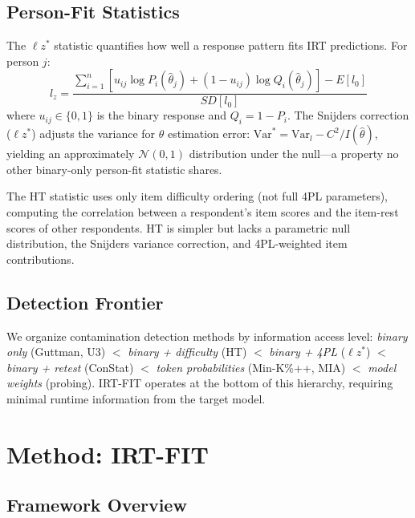 \documentclass[11pt,twocolumn]{article}
\newcommand{\lzs}{\ensuremath{\ell z^*}}
\begin{document}
\subsection{Person-Fit Statistics}

The $\lzs$ statistic \citep{drasgow1985appropriateness,snijders2001} quantifies how well a response pattern fits IRT predictions. For person $j$:
\begin{equation}
l_z = \frac{\sum_{i=1}^{n} [u_{ij} \log P_i(\hat{\theta}_j) + (1-u_{ij}) \log Q_i(\hat{\theta}_j)] - E[l_0]}{SD[l_0]}
\end{equation}
where $u_{ij} \in \{0,1\}$ is the binary response and $Q_i = 1 - P_i$. The Snijders correction ($\lzs$) adjusts the variance for $\theta$ estimation error: $\text{Var}^* = \text{Var}_{l} - C^2 / I(\hat{\theta})$, yielding an approximately $\mathcal{N}(0,1)$ distribution under the null---a property no other binary-only person-fit statistic shares.

The HT statistic \citep{sijtsma1998} uses only item difficulty ordering (not full 4PL parameters), computing the correlation between a respondent's item scores and the item-rest scores of other respondents. HT is simpler but lacks a parametric null distribution, the Snijders variance correction, and 4PL-weighted item contributions.

\subsection{Detection Frontier}

We organize contamination detection methods by information access level: \emph{binary only} (Guttman, U3) $<$ \emph{binary + difficulty} (HT) $<$ \emph{binary + 4PL} ($\lzs$) $<$ \emph{binary + retest} (ConStat) $<$ \emph{token probabilities} (Min-K\%++, MIA) $<$ \emph{model weights} (probing). IRT-FIT operates at the bottom of this hierarchy, requiring minimal runtime information from the target model.

\section{Method: IRT-FIT}

\subsection{Framework Overview}
\end{document}
